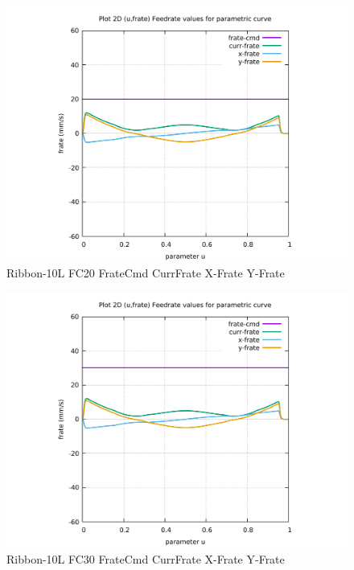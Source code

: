 \begin{figure}
	\caption     {Ribbon-10L FC20 FrateCmd CurrFrate X-Frate Y-Frate}
	\label{28-img-Ribbon-10L-FC20-FrateCmd-CurrFrate-X-Frate-Y-Frate.pdf}
\includegraphics[width=1.00\textwidth]{Chap4/appendix/app-Ribbon-10L/plots/28-img-Ribbon-10L-FC20-FrateCmd-CurrFrate-X-Frate-Y-Frate.pdf}
\end{figure}


\clearpage
\pagebreak

\begin{figure}
	\caption     {Ribbon-10L FC30 FrateCmd CurrFrate X-Frate Y-Frate}
	\label{29-img-Ribbon-10L-FC30-FrateCmd-CurrFrate-X-Frate-Y-Frate.pdf}
\includegraphics[width=1.00\textwidth]{Chap4/appendix/app-Ribbon-10L/plots/29-img-Ribbon-10L-FC30-FrateCmd-CurrFrate-X-Frate-Y-Frate.pdf}
\end{figure}


